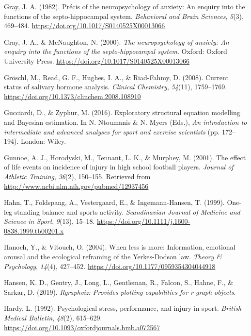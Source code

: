 \documentclass[
  english,
  man,floatsintext]{apa6}
\begin{document}
\leavevmode\hypertarget{ref-Gray1982a}{}%
Gray, J. A. (1982). Précis of the neuropsychology of anxiety: An enquiry into the functions of the septo-hippocampal system. \emph{Behavioral and Brain Sciences}, \emph{5}(3), 469--484. \url{https://doi.org/10.1017/S0140525X00013066}

\leavevmode\hypertarget{ref-Gray2000}{}%
Gray, J. A., \& McNaughton, N. (2000). \emph{The neuropsychology of anxiety: An enquiry into the functions of the septo-hippocampal system}. Oxford: Oxford University Press. \url{https://doi.org/10.1017/S0140525X00013066}

\leavevmode\hypertarget{ref-Groschl2008}{}%
Gröschl, M., Read, G. F., Hughes, I. A., \& Riad-Fahmy, D. (2008). Current status of salivary hormone analysis. \emph{Clinical Chemistry}, \emph{54}(11), 1759--1769. \url{https://doi.org/10.1373/clinchem.2008.108910}

\leavevmode\hypertarget{ref-Gucci2016}{}%
Gucciardi, D., \& Zyphur, M. (2016). Exploratory structural equation modelling and Bayesian estimation. In N. Ntoumanis \& N. Myers (Eds.), \emph{An introduction to intermediate and advanced analyses for sport and exercise scientists} (pp. 172--194). London: Wiley.

\leavevmode\hypertarget{ref-Gunnoe2001}{}%
Gunnoe, A. J., Horodyski, M., Tennant, L. K., \& Murphey, M. (2001). The effect of life events on incidence of injury in high school football players. \emph{Journal of Athletic Training}, \emph{36}(2), 150--155. Retrieved from \url{http://www.ncbi.nlm.nih.gov/pubmed/12937456}

\leavevmode\hypertarget{ref-Hahn1999}{}%
Hahn, T., Foldspang, A., Vestergaard, E., \& Ingemann-Hansen, T. (1999). One-leg standing balance and sports activity. \emph{Scandinavian Journal of Medicine and Science in Sport}, \emph{9}(13), 15--18. \url{https://doi.org/10.1111/j.1600-0838.1999.tb00201.x}

\leavevmode\hypertarget{ref-Hanoch2004}{}%
Hanoch, Y., \& Vitouch, O. (2004). When less is more: Information, emotional arousal and the ecological reframing of the Yerkes-Dodson law. \emph{Theory \& Psychology}, \emph{14}(4), 427--452. \url{https://doi.org/10.1177/0959354304044918}

\leavevmode\hypertarget{ref-R-Rgraphviz}{}%
Hansen, K. D., Gentry, J., Long, L., Gentleman, R., Falcon, S., Hahne, F., \& Sarkar, D. (2019). \emph{Rgraphviz: Provides plotting capabilities for r graph objects}.

\leavevmode\hypertarget{ref-Hardy1992}{}%
Hardy, L. (1992). Psychological stress, performance, and injury in sport. \emph{British Medical Bulletin}, \emph{48}(2), 615--629. \url{https://doi.org/10.1093/oxfordjournals.bmb.a072567}
\end{document}
